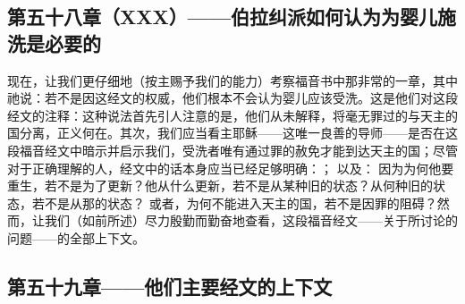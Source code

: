 
\subsection{第五十八章（XXX）——伯拉纠派如何认为为婴儿施洗是必要的}

现在，让我们更仔细地（按主赐予我们的能力）考察福音书中那非常的一章，其中祂说：若不是因这经文的权威，他们根本不会认为婴儿应该受洗。这是他们对这段经文的注释：这种说法首先引人注意的是，他们从未解释，将毫无罪过的与天主的国分离，正义何在。其次，我们应当看主耶稣——这唯一良善的导师——是否在这段福音经文中暗示并启示我们，受洗者唯有通过罪的赦免才能到达天主的国；尽管对于正确理解的人，经文中的话本身应当已经足够明确：； 以及： 因为为何他要重生，若不是为了更新？他从什么更新，若不是从某种旧的状态？从何种旧的状态，若不是从那的状态？ 或者，为何不能进入天主的国，若不是因罪的阻碍？然而，让我们（如前所述）尽力殷勤而勤奋地查看，这段福音经文——关于所讨论的问题——的全部上下文。\par


\subsection{第五十九章——他们主要经文的上下文}

